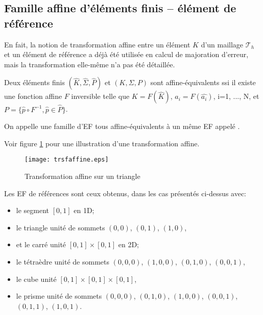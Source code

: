 \medskip
\subsection{Famille affine d'éléments finis -- élément de référence}

En fait, la notion de transformation affine entre un élément $K$ d'un maillage
$\mathcal{T}_h$ et un élément de référence a déjà été utilisée en
calcul de majoration d'erreur, mais la transformation elle-même n'a pas été
détaillée.

\medskip{}\scriptsize
Deux éléments finis $(\hat{K}, \hat{\Sigma}, \hat{P})$ et $(K, \Sigma, P)$ sont
affine-équivalents ssi il existe une fonction affine $F$ inversible telle que
$K=F(\hat{K})$, $a_i=F(\hat{a_i})$, i=1, ..., N, et $P=\{\hat{p}\circ F^{-1}, \hat{p}\in\hat{P}\}$.
\normalsize

\medskip
\begin{definition}
On appelle  une famille d'EF
tous affine-équivalents à un même EF appelé .
\end{definition}

\medskip
{}
Voir figure \ref{trsfaffine} pour une illustration d'une transformation affine.
\begin{figure}[ht]
\begin{center}
\texttt{[image: trsfaffine.eps]}
\caption{\label{trsfaffine} Transformation affine sur un triangle}
\end{center}
\end{figure}

\medskip
Les EF de références sont ceux obtenus, dans les cas présentés ci-dessus avec:
\begin{itemize}
   \item le segment $[0,1]$ en 1D; 
   \item le triangle unité de sommets $(0,0)$, $(0,1)$, $(1,0)$, 
   \item et le carré unité $[0,1]\times[0,1]$ en 2D; 
   \item le tétraèdre unité de sommets $(0,0,0)$, $(1,0,0)$, $(0,1,0)$, $(0,0,1)$, 
   \item le cube unité $[0,1]\times[0,1]\times[0,1]$, 
   \item le prisme unité de sommets $(0,0,0)$, $(0,1,0)$, $(1,0,0)$, $(0,0,1)$, $(0,1,1)$, $(1,0,1)$.
\end{itemize}



